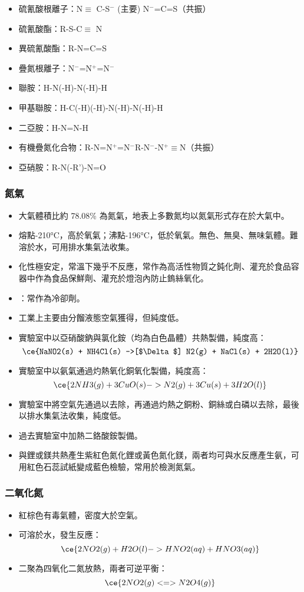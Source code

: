 \documentclass[a4paper,12pt]{report}
\begin{document}
\begin{itemize}
\item 硫氰酸根離子：N$\equiv$ C-S$^-$ (主要) \ce{<=>} N$^-$=C=S（共振）
\item 硫氰酸酯：R-S-C$\equiv$ N
\item 異硫氰酸酯：R-N=C=S
\item 疊氮根離子：N$^-$=N$^+$=N$^-$
\item 聯胺：H-N(-H)-N(-H)-H
\item 甲基聯胺：H-C(-H)(-H)-N(-H)-N(-H)-H
\item 二亞胺：H-N=N-H
\item 有機疊氮化合物：R-N=N$^+$=N$^-$\ce{<=>}R-N$^-$-N$^+\equiv$N（共振）
\item 亞硝胺：R-N(-R')-N=O
\end{itemize}
\subsubsection{氮氣}
\begin{itemize}
\item 大氣體積比約 78.08\% 為氮氣，地表上多數氮均以氮氣形式存在於大氣中。
\item 熔點-210°C，高於氧氣；沸點-196°C，低於氧氣。無色、無臭、無味氣體。難溶於水，可用排水集氣法收集。
\item 化性極安定，常溫下幾乎不反應，常作為高活性物質之鈍化劑、灌充於食品容器中作為食品保鮮劑、灌充於燈泡內防止鎢絲氧化。
\item {}：常作為冷卻劑。
\item 工業上主要由分餾液態空氣獲得，但純度低。
\item 實驗室中以亞硝酸鈉與氯化銨（均為白色晶體）共熱製備，純度高：
\[\ce{NaNO2(s) + NH4Cl(s) ->[$\Delta$] N2(g) + NaCl(s) + 2H2O(l)}\]
\item 實驗室中以氨氣通過灼熱氧化銅氧化製備，純度高：
\[\ce{2NH3(g) + 3CuO(s) -> N2(g) + 3Cu(s) + 3H2O(l)}\]
\item 實驗室中將空氣先通過以去除，再通過灼熱之銅粉、銅絲或白磷以去除，最後以排水集氣法收集，純度低。
\item 過去實驗室中加熱二鉻酸銨製備。
\item 與鋰或鎂共熱產生紫紅色氮化鋰或黃色氮化鎂，兩者均可與水反應產生氨，可用紅色石蕊試紙變成藍色檢驗，常用於檢測氮氣。
\end{itemize}
\subsubsection{二氧化氮}
\begin{itemize}
\item 紅棕色有毒氣體，密度大於空氣。
\item 可溶於水，發生反應：
\[\ce{2NO2(g) + H2O(l) -> HNO2(aq) + HNO3(aq)}\]
\item 二聚為四氧化二氮放熱，兩者可逆平衡：
\[\ce{2NO2(g) <=> N2O4(g)}\]
\end{itemize}
\end{document}
